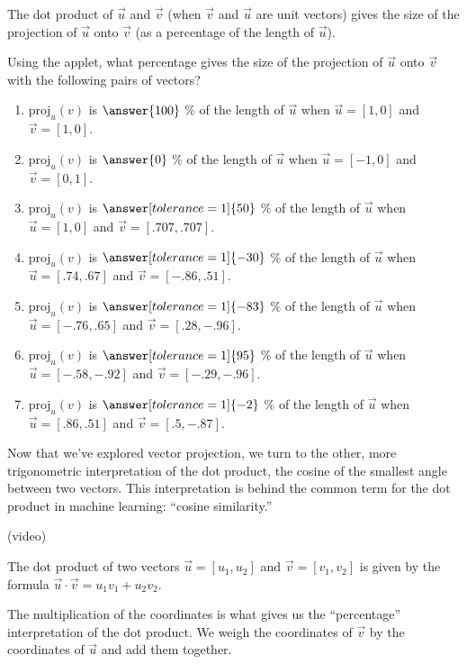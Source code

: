 \documentclass{ximera}
\begin{document}
\begin{problem}
The dot product of $\vec{u}$ and $\vec{v}$ (when $\vec{v}$  and $\vec{u}$ are unit vectors) gives the size of the projection of $\vec{u}$ onto $\vec{v}$ (as a percentage of the length of $\vec{u}$).

Using the applet, what percentage gives the size of the projection of $\vec{u}$ onto $\vec{v}$ with the following pairs of vectors?

\begin{enumerate}
\item $\text{proj}_u(v)$ is $\answer{100}$ $\%$ of the length of $\vec{u}$ when $\vec{u}=[1,0]$ and $\vec{v}=[1,0]$.
\item $\text{proj}_u(v)$ is $\answer{0}$ $\%$ of the length of $\vec{u}$ when $\vec{u}=[-1,0]$ and $\vec{v}=[0,1]$.
\item $\text{proj}_u(v)$ is $\answer[tolerance=1]{50}$ $\%$ of the length of $\vec{u}$ when $\vec{u}=[1,0]$ and $\vec{v}=[.707,.707]$.
\item $\text{proj}_u(v)$ is $\answer[tolerance=1]{-30}$ $\%$ of the length of $\vec{u}$ when $\vec{u}=[.74,.67]$ and $\vec{v}=[-.86,.51]$.
\item $\text{proj}_u(v)$ is $\answer[tolerance=1]{-83}$ $\%$ of the length of $\vec{u}$ when $\vec{u}=[-.76,.65]$ and $\vec{v}=[.28,-.96]$.
\item $\text{proj}_u(v)$ is $\answer[tolerance=1]{95}$ $\%$ of the length of $\vec{u}$ when $\vec{u}=[-.58,-.92]$ and $\vec{v}=[-.29,-.96]$.
\item $\text{proj}_u(v)$ is $\answer[tolerance=1]{-2}$ $\%$ of the length of $\vec{u}$ when $\vec{u}=[.86,.51]$ and $\vec{v}=[.5,-.87]$.
\end{enumerate}
\end{problem}

Now that we've explored vector projection, we turn to the other, more trigonometric interpretation of the dot product, the cosine of the smallest angle between two vectors. This interpretation is behind the common term for the dot product in machine learning: ``cosine similarity.''

(video)

\begin{definition}
The dot product of two vectors $\vec{u}=[u_1,u_2]$ and $\vec{v}=[v_1,v_2]$ is given by the formula $\vec{u}\cdot\vec{v}=u_1v_1+u_2v_2$.
\end{definition}

\begin{remark}
    The multiplication of the coordinates is what gives us the ``percentage'' interpretation of the dot product. We weigh the coordinates of $\vec{v}$ by the coordinates of $\vec{u}$ and add them together.
\end{remark}
\end{document}
